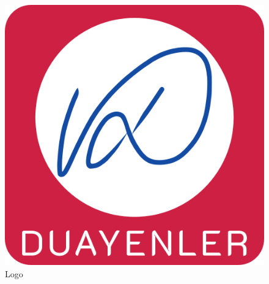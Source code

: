 \begin{figure}[H]
\center
\setlength{\unitlength}{\textwidth} 
\includegraphics[width=0.7\unitlength]{images/logo1}
\caption{\label{fig:logo}Logo }
\end{figure}


